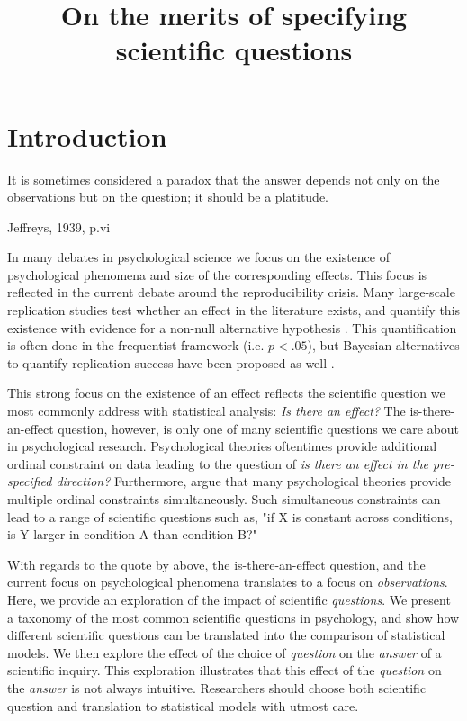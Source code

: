 \documentclass[natbib,doc,12pt,floatsintext]{apa6}
\title{On the merits of specifying scientific questions}
\begin{document}
\onehalfspacing

\maketitle

\newpage

\section{Introduction}

\setlength{\epigraphwidth}{.8\textwidth} %
\epigraph{It is sometimes considered a paradox that the answer depends not only on the observations but on the question; it should be a platitude.}{Jeffreys, 1939, p.vi}

In many debates in psychological science we focus on the existence of psychological phenomena and size of the corresponding effects. This focus is reflected in the current debate around the reproducibility crisis. Many large-scale replication studies test whether an effect in the literature exists, and quantify this existence with evidence for a non-null alternative hypothesis \citep{OpenScienceCollaboration:2015, Ebersole:etal:2016}. This quantification is often done in the frequentist framework (i.e. $p<.05$), but Bayesian alternatives to quantify replication success have been proposed as well \citep{Verhagen:Wagenmakers:2014}.

This strong focus on the existence of an effect reflects the scientific question we most commonly address with statistical analysis: \textit{Is there an effect?} The is-there-an-effect question, however, is only one of many scientific questions we care about in psychological research. Psychological theories oftentimes provide additional ordinal constraint on data leading to the question of \textit{is there an effect in the pre-specified direction?} Furthermore, \cite{Haaf:etal:2019} argue that many psychological theories provide multiple ordinal constraints simultaneously. Such simultaneous constraints can lead to a range of scientific questions such as, "if X is constant across conditions, is Y larger in condition A than condition B?" 

With regards to the quote by \cite{Jeffreys:1939} above, the is-there-an-effect question, and the current focus on psychological phenomena translates to a focus on \textit{observations}. Here, we provide an exploration of the impact of scientific \textit{questions}. We present a taxonomy of the most common scientific questions in psychology, and show how different scientific questions can be translated into the comparison of statistical models. We then explore the effect of the choice of \textit{question} on the \textit{answer} of a scientific inquiry. This exploration illustrates that this effect of the \textit{question} on the \textit{answer} is not always intuitive. Researchers should choose both scientific question and translation to statistical models with utmost care.
\end{document}
